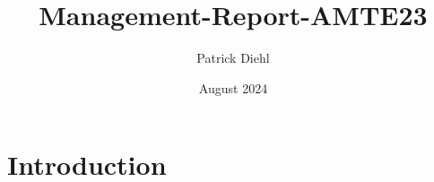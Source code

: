\documentclass{article}
\title{Management-Report-AMTE23}
\author{Patrick Diehl}
\date{August 2024}
\begin{document}
\maketitle

\section{Introduction}
\end{document}
